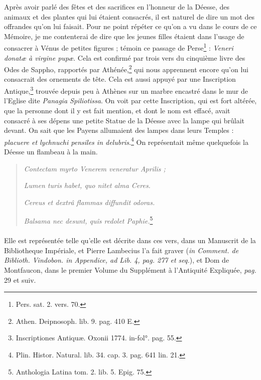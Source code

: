 \documentclass[a4paper, 11pt, oneside, polutonikogreek, french]{article}
\begin{document}
Après avoir parlé des fêtes et des sacrifices en l'honneur de la Déesse, des animaux et des plantes qui lui étaient consacrés, il est naturel de dire un mot des offrandes qu'on lui faisait. Pour ne point répéter ce qu'on a vu dans le cours de ce Mémoire, je me contenterai de dire que les jeunes filles étaient dans l'usage de consacrer à Vénus de petites figures ; témoin ce passage de Perse\footnote{Pers. sat. 2. vers. 70.} : \emph{Veneri donatæ à virgine pupæ}. Cela est confirmé par trois vers du cinquième livre des Odes de Sappho, rapportés par Athénée,\footnote{Athen. Deipnosoph. lib. 9. pag. 410 E.} qui nous apprennent encore qu'on lui consacrait des ornements de tête. Cela est aussi appuyé par une Inscription Antique,\footnote{Inscriptiones Antiquæ. Oxonii 1774. in-fol°. pag. 55.} trouvée depuis peu à Athènes sur un marbre encastré dans le mur de l'Eglise dite \emph{Panagia Spiliotissa}. On voit par cette Inscription, qui est fort altérée, que la personne dont il y est fait mention, et dont le nom est effacé, avait consacré à ses dépens une petite Statue de la Déesse avec la lampe qui brûlait devant. On sait que les Payens allumaient des lampes dans leurs Temples : \emph{placuere et lychnuchi pensiles in delubris}.\footnote{Plin. Histor. Natural. lib. 34. cap. 3. pag. 641 lin. 21.} On représentait même quelquefois la Déesse un flambeau à la main.
\begin{quotation}
\emph{Contectam myrto Venerem veneratur Aprilis ;}

\hspace*{5mm}\emph{Lumen turis habet, quo nitet alma Ceres.}

\emph{Cereus et dextrâ flammas diffundit odoras.}

\hspace*{5mm}\emph{Balsama nec desunt, quîs redolet Paphie.}\footnote{Anthologia Latina tom. 2. lib. 5. Epig. 75.}
\end{quotation}
\paragraph{}
Elle est représentée telle qu'elle est décrite dans ces vers, dans un Manuscrit de la Bibliotheque Impériale, et Pierre Lambecius l'a fait graver (\emph{in Comment. de Biblioth. Vindobon. in Appendice, ad Lib. 4, pag. 277 et seq.}), et Dom de Montfaucon, dans le premier Volume du Supplément à l'Antiquité Expliquée, \emph{pag.} 29 et suiv.
\end{document}
